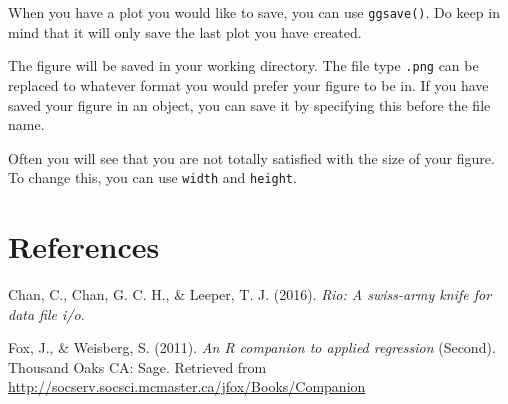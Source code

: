 \documentclass[12pt,oneside]{reedthesis}
\theoremstyle{definition}
\theoremstyle{definition}
\theoremstyle{definition}
\theoremstyle{remark}
\begin{document}
  When you have a plot you would like to save, you can use
  \texttt{ggsave()}. Do keep in mind that it will only save the last plot
  you have created.
  \begin{Shaded}
  \begin{Highlighting}[]
  \NormalTok{(}\NormalTok{)}
  \end{Highlighting}
  \end{Shaded}
  The figure will be saved in your working directory. The file type
  \texttt{.png} can be replaced to whatever format you would prefer your
  figure to be in. If you have saved your figure in an object, you can
  save it by specifying this before the file name.
  \begin{Shaded}
  \begin{Highlighting}[]
  \NormalTok{)}
  \end{Highlighting}
  \end{Shaded}
  Often you will see that you are not totally satisfied with the size of
  your figure. To change this, you can use \texttt{width} and
  \texttt{height}.
  \begin{Shaded}
  \begin{Highlighting}[]
  \NormalTok{, } \NormalTok{, } \NormalTok{)}
  \end{Highlighting}
  \end{Shaded}
  \backmatter
  
  \chapter{References}\label{references}
  
  \noindent
  
  \setlength{\parindent}{-0.20in} \setlength{\leftskip}{0.20in}
  \setlength{\parskip}{8pt}
  
  \hypertarget{refs}{}
  \hypertarget{ref-chanetal2016}{}
  Chan, C., Chan, G. C. H., \& Leeper, T. J. (2016). \emph{Rio: A
  swiss-army knife for data file i/o}.
  
  \hypertarget{ref-foxweisberg2011}{}
  Fox, J., \& Weisberg, S. (2011). \emph{An R companion to applied
  regression} (Second). Thousand Oaks CA: Sage. Retrieved from
  \url{http://socserv.socsci.mcmaster.ca/jfox/Books/Companion}
  
\end{document}
